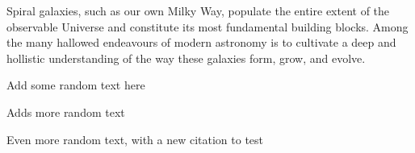 Spiral galaxies, such as our own Milky Way, populate the entire extent of the observable Universe and constitute its most fundamental building blocks. Among the many hallowed endeavours of modern astronomy is to cultivate a deep and hollistic understanding of the way these galaxies form, grow, and evolve. 

Add some random text here

Adds more random text

Even more random text, with a new citation to test \cite{amorisco17}